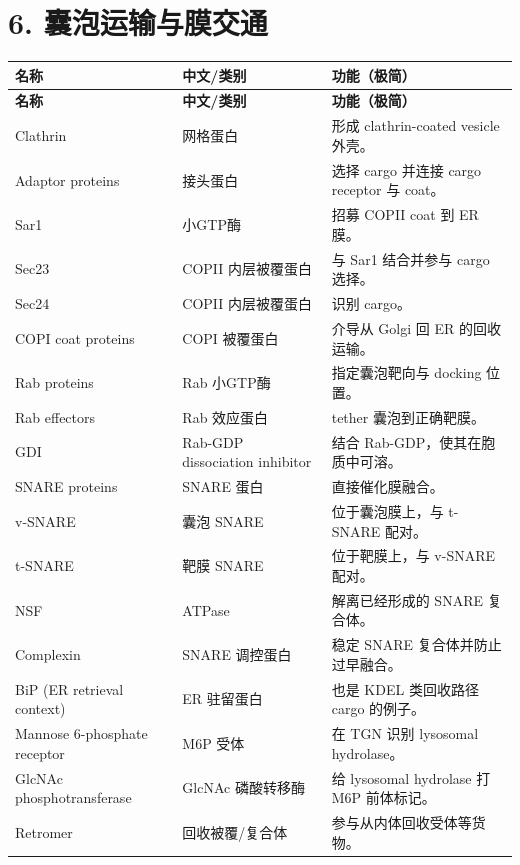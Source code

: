 \documentclass[11pt,fontset=none]{ctexart}
\begin{document}
\section*{6. 囊泡运输与膜交通}
\begin{longtable}{L{3.2cm} L{3.8cm} L{8.5cm}}
\toprule
\textbf{名称} & \textbf{中文/类别} & \textbf{功能（极简）} \\
\midrule
\endfirsthead
\toprule
\textbf{名称} & \textbf{中文/类别} & \textbf{功能（极简）} \\
\midrule
\endhead
\bottomrule
\endfoot
Clathrin & 网格蛋白 & 形成 clathrin-coated vesicle 外壳。 \\
Adaptor proteins & 接头蛋白 & 选择 cargo 并连接 cargo receptor 与 coat。 \\
Sar1 & 小GTP酶 & 招募 COPII coat 到 ER 膜。 \\
Sec23 & COPII 内层被覆蛋白 & 与 Sar1 结合并参与 cargo 选择。 \\
Sec24 & COPII 内层被覆蛋白 & 识别 cargo。 \\
COPI coat proteins & COPI 被覆蛋白 & 介导从 Golgi 回 ER 的回收运输。 \\
Rab proteins & Rab 小GTP酶 & 指定囊泡靶向与 docking 位置。 \\
Rab effectors & Rab 效应蛋白 & tether 囊泡到正确靶膜。 \\
GDI & Rab-GDP dissociation inhibitor & 结合 Rab-GDP，使其在胞质中可溶。 \\
SNARE proteins & SNARE 蛋白 & 直接催化膜融合。 \\
v-SNARE & 囊泡 SNARE & 位于囊泡膜上，与 t-SNARE 配对。 \\
t-SNARE & 靶膜 SNARE & 位于靶膜上，与 v-SNARE 配对。 \\
NSF & ATPase & 解离已经形成的 SNARE 复合体。 \\
Complexin & SNARE 调控蛋白 & 稳定 SNARE 复合体并防止过早融合。 \\
BiP (ER retrieval context) & ER 驻留蛋白 & 也是 KDEL 类回收路径 cargo 的例子。 \\
Mannose 6-phosphate receptor & M6P 受体 & 在 TGN 识别 lysosomal hydrolase。 \\
GlcNAc phosphotransferase & GlcNAc 磷酸转移酶 & 给 lysosomal hydrolase 打 M6P 前体标记。 \\
Retromer & 回收被覆/复合体 & 参与从内体回收受体等货物。 \\
\end{longtable}
\end{document}
